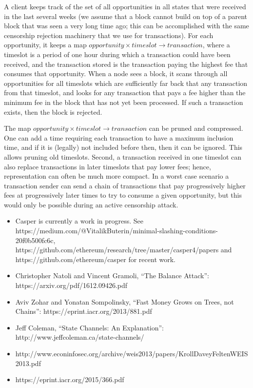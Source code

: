 \documentclass[12pt]{article}
\begin{document}
A client keeps track of the set of all opportunities in all states that were received in the last several weeks (we assume that a block cannot build on top of a parent block that was seen a very long time ago; this can be accomplished with the same censorship rejection machinery that we use for transactions). For each opportunity, it keeps a map $opportunity \times timeslot \rightarrow transaction$, where a timeslot is a period of one hour during which a transaction could have been received, and the transaction stored is the transaction paying the highest fee that consumes that opportunity. When a node sees a block, it scans through all opportunities for all timeslots which are sufficiently far back that any transaction from that timeslot, and looks for any transaction that pays a fee higher than the minimum fee in the block that has not yet been processed. If such a transaction exists, then the block is rejected.

The map $opportunity \times timeslot \rightarrow transaction$ can be pruned and compressed. One can add a time requiring each transaction to have a maximum inclusion time, and if it is (legally) not included before then, then it can be ignored. This allows pruning old timeslots. Second, a transaction received in one timeslot can also replace transactions in later timeslots that pay lower fees; hence, representation can often be much more compact. In a worst case scenario a transaction sender can send a chain of transactions that pay progressively higher fees at progressively later times to try to consume a given opportunity, but this would only be possible during an active censorship attack.




\begin{itemize}
\item Casper is currently a work in progress. See https://medium.com/@VitalikButerin/minimal-slashing-conditions-20f0b500fc6c, https://github.com/ethereum/research/tree/master/casper4/papers and https://github.com/ethereum/casper for recent work.
\item Christopher Natoli and Vincent Gramoli, ``The Balance Attack'': https://arxiv.org/pdf/1612.09426.pdf
\item Aviv Zohar and Yonatan Sompolinsky, ``Fast Money Grows on Trees, not Chains'': https://eprint.iacr.org/2013/881.pdf
\item Jeff Coleman, ``State Channels: An Explanation'': http://www.jeffcoleman.ca/state-channels/
\item http://www.econinfosec.org/archive/weis2013/papers/KrollDaveyFeltenWEIS2013.pdf
\item https://eprint.iacr.org/2015/366.pdf
\end{itemize}
\end{document}
